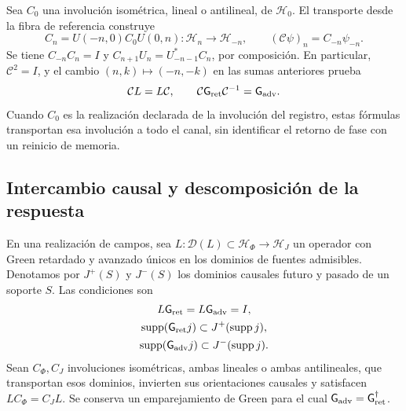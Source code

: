 Sea \(C_0\) una involución isométrica, lineal o antilineal, de
\(\mathcal H_0\). El transporte desde la fibra de referencia construye
\[
 C_n=U(-n,0)C_0U(0,n):\mathcal H_n\longrightarrow\mathcal H_{-n},
 \qquad (\mathcal C\psi)_n=C_{-n}\psi_{-n}.
\]
Se tiene \(C_{-n}C_n=I\) y
\(C_{n+1}U_n=U_{-n-1}^*C_n\), por composición.
En particular, \(\mathcal C^2=I\), y el cambio \((n,k)\mapsto(-n,-k)\)
en las sumas anteriores prueba
\begin{equation}
 \mathcal C L=L\mathcal C,\qquad
 \mathcal C \mathsf{G}_{\rm ret}\mathcal C^{-1}=\mathsf{G}_{\rm adv}.
 \label{vii:eq:intercambio-green-cronologico}
\end{equation}
Cuando \(C_0\) es la realización declarada de la involución del registro,
estas fórmulas transportan esa involución a todo el canal, sin identificar
el retorno de fase con un reinicio de memoria.

\subsection{Intercambio causal y descomposición de la respuesta}
\label{vii:subsec:green-realizacion-campos}

En una realización de campos, sea
\(L:\mathcal D(L)\subset\mathcal H_\Phi\to\mathcal H_J\)
un operador con Green retardado y avanzado únicos en los dominios de
fuentes admisibles. Denotamos por \(J^+(S)\) y \(J^-(S)\) los
dominios causales futuro y pasado de un soporte \(S\). Las condiciones son
\[
 \begin{gathered}
 L\mathsf{G}_{\rm ret}=L\mathsf{G}_{\rm adv}=I,\\
 \operatorname{supp}(\mathsf{G}_{\rm ret}j)\subset J^+(\operatorname{supp}j),\\
 \operatorname{supp}(\mathsf{G}_{\rm adv}j)\subset J^-(\operatorname{supp}j).
 \end{gathered}
\]
Sean \(C_\Phi,C_J\) involuciones isométricas, ambas lineales o ambas
antilineales, que transportan esos dominios,
invierten sus orientaciones causales y satisfacen
\(LC_\Phi=C_JL\). Se conserva un emparejamiento de Green para el cual
\(\mathsf{G}_{\rm adv}=\mathsf{G}_{\rm ret}^{\dagger}\).

